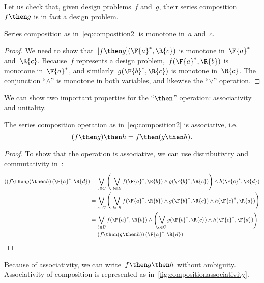 Let us check that, given design problems~$f$ and~$g$, their series composition~$f\then g$ is in fact a design problem.
\begin{lemma}
  Series composition as in~\cref{eq:composition2} is monotone in~$a$ and~$c$.
\end{lemma}
\begin{proof}
  We need to show that~$[f\then g](\F{a}^*,\R{c})$ is monotone in~$\F{a}^*$ and~$\R{c}$. Because~$f$ represents a design problem,~$f(\F{a}^*,\R{b})$ is monotone in~$\F{a}^*$, and similarly~$g(\F{b}^*,\R{c})$ is monotone in~$\R{c}$. The conjunction ``$\wedge$'' is monotone in both variables, and likewise the ``$\vee$'' operation.
\end{proof}

We can show two important properties for the ``$\then$'' operation: associativity and unitality.
\begin{lemma}
  The series composition operation as in~\cref{eq:composition2} is associative, i.e.
  \begin{equation}
    (f\then g)\then h = f\then (g\then h).
  \end{equation}
\end{lemma}

\begin{proof}
  To show that the operation is associative, we can use distributivity and commutativity in~\Bool:
%
  \begin{equation}
    \begin{aligned}
      \left((f\then g) \then h\right) (\F{a}^*,\R{d})
      &= \bigvee_{c \in C} \left (\ \bigvee_{b\in B } f(\F{a}^*,\R{b}) \wedge g(\F{b}^*,\R{c}) \right )  \wedge  h (\F{c}^*, \R{d}) \\
      &= \bigvee_{c \in C} \left (\ \bigvee_{b\in B } f(\F{a}^*,\R{b})
      \wedge g(\F{b}^*,\R{c}) \wedge h (\F{c}^*, \R{d})
      \right ) \\
      &= \bigvee_{b \in B } f(\F{a}^*,\R{b}) \wedge \left ( \bigvee_{c\in C} g(\F{b}^*,\R{c}) \wedge h (\F{c}^*, \F{d}) \right ) \\
      &= \left(f \then (g \then h )\right) (\F{a}^*, \R{d}).
    \end{aligned}
  \end{equation}
%
\end{proof}

Because of associativity, we can write~$f\then g\then h$ without ambiguity.
Associativity of composition is represented as in~\cref{fig:compositionassociativity}.

